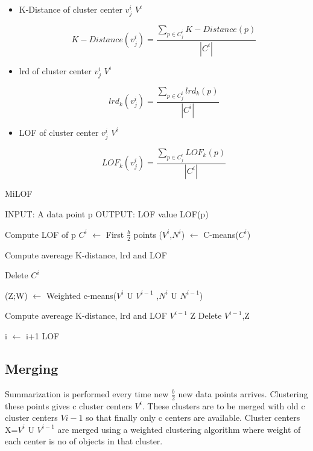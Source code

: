 \begin{itemize}
	\item K-Distance of cluster center $v^i_j$ \in $V^i$ 
	
	
		\[  K-Distance(v^i_j) = \frac{\sum_{p \in C^i_j } K-Distance(p)}{| C^i |} \]
		
		
	 \item lrd of cluster center $v^i_j$ \in $V^i$ 
		
		
		\[  lrd_k(v^i_j) = \frac{\sum_{p \in C^i_j } lrd_k(p)}{| C^i |} \]
		
		\item LOF of cluster center $v^i_j$ \in $V^i$ 
		
		
		\[  LOF_k(v^i_j) = \frac{\sum_{p \in C^i_j } LOF_k(p)}{| C^i |} \]
	
\end{itemize}


\begin{algorithm}[h!]
	\caption{MiLOF}
	\begin{algorithmic}
		\STATE  
		\STATE INPUT:  A data point p 
		\STATE OUTPUT: LOF value LOF(p)
		\STATE
		
		\STATE Compute LOF of p 
			\STATE $C^i$ $\leftarrow$ First $\frac{b}{2}$ points
			\STATE ($V^i$,$N^i$) $\leftarrow$ C-means($C^i$)
			
			  \STATE Compute avereage K-distance, lrd and LOF
			\ENDFOR
			
			\STATE Delete $C^i$
			
				\STATE (Z;W) $\leftarrow$ Weighted c-means($V^i$ U $V^{i-1}$ ,$N^i$ U $N^{i-1}$)
				
					\STATE Compute avereage K-distance, lrd and LOF
				\ENDFOR 
				\STATE $V^{i-1}$ \leftarrow Z
				\STATE Delete $V^{i-1}$,Z
				
			\ENDIF	
		\ENDIF
		
		\STATE i $\leftarrow$ i+1
		\RETURN LOF
	\end{algorithmic}
\end{algorithm}

\subsection{Merging}

Summarization is performed every time new $\frac{b}{2}$ new data points arrives. Clustering these points gives c cluster centers $V^i$. These clusters are to be merged with old c cluster centers $V{i-1}$ so that finally only c centers are available. Cluster centers X={$V^i$ U $V^{i-1}$} are merged using a weighted clustering algorithm where weight of each center is no of objects in that cluster. 



